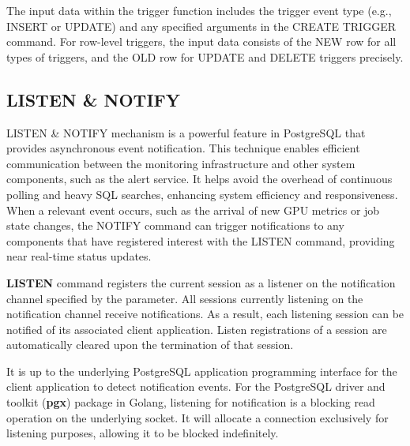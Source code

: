 
The input data within the trigger function includes the trigger event type (e.g., INSERT or UPDATE) and any specified arguments in the CREATE TRIGGER command. For row-level triggers, the input data consists of the NEW row for all types of triggers, and the OLD row for UPDATE and DELETE triggers precisely.

\subsection{LISTEN \& NOTIFY}

LISTEN \& NOTIFY mechanism \cite{Shaik2023listen, postgresql-doc} is a powerful feature in PostgreSQL that provides asynchronous event notification. This technique enables efficient communication between the monitoring infrastructure and other system components, such as the alert service. It helps avoid the overhead of continuous polling and heavy SQL searches, enhancing system efficiency and responsiveness. When a relevant event occurs, such as the arrival of new GPU metrics or job state changes, the NOTIFY command can trigger notifications to any components that have registered interest with the LISTEN command, providing near real-time status updates.

\textbf{LISTEN} command registers the current session as a listener on the notification channel specified by the parameter. All sessions currently listening on the notification channel receive notifications. As a result, each listening session can be notified of its associated client application. Listen registrations of a session are automatically cleared upon the termination of that session.

It is up to the underlying PostgreSQL application programming interface for the client application to detect notification events. For the PostgreSQL driver and toolkit (\textbf{pgx}) package in Golang, listening for notification is a blocking read operation on the underlying socket. It will allocate a connection exclusively for listening purposes, allowing it to be blocked indefinitely.

